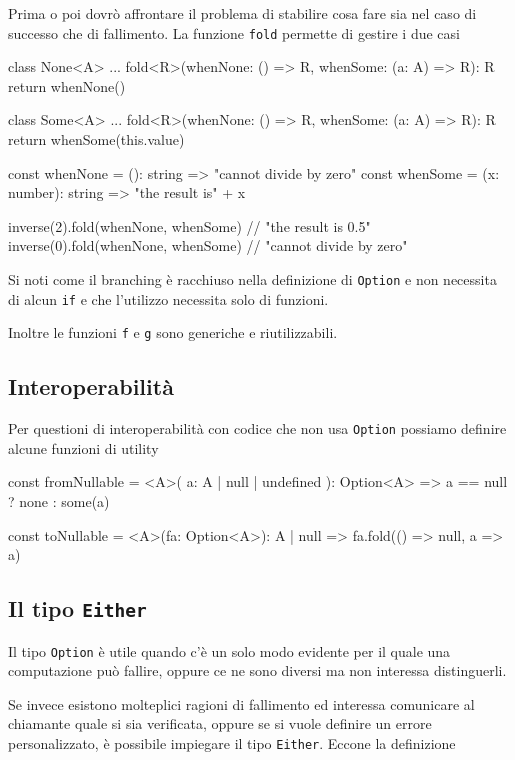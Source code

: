 \documentclass[12pt]{article}
\theoremstyle{definition}
\newenvironment{code}
  {\vspace{0.5cm} \VerbatimEnvironment\begin{typescriptcode}}
  {\end{typescriptcode} \vspace{0.2cm}}
\begin{document}
Prima o poi dovrò affrontare il problema di stabilire cosa fare sia nel caso di successo che di fallimento.
La funzione \texttt{fold} permette di gestire i due casi

\begin{code}
class None<A> {
  ...
  fold<R>(whenNone: () => R, whenSome: (a: A) => R): R {
    return whenNone()
  }
}

class Some<A> {
  ...
  fold<R>(whenNone: () => R, whenSome: (a: A) => R): R {
    return whenSome(this.value)
  }
}

const whenNone = (): string => "cannot divide by zero"
const whenSome = (x: number): string => "the result is" + x

inverse(2).fold(whenNone, whenSome) // "the result is 0.5"
inverse(0).fold(whenNone, whenSome) // "cannot divide by zero"
\end{code}

Si noti come il branching è racchiuso nella definizione di \texttt{Option} e non necessita di alcun \texttt{if}
e che l'utilizzo necessita solo di funzioni.

Inoltre le funzioni \texttt{f} e \texttt{g} sono generiche e riutilizzabili.

\subsection{Interoperabilità}

Per questioni di interoperabilità con codice che non usa \texttt{Option} possiamo definire alcune funzioni di utility

\begin{code}
const fromNullable = <A>(
  a: A | null | undefined
): Option<A> => a == null ? none : some(a)

const toNullable = <A>(fa: Option<A>): A | null =>
  fa.fold(() => null, a => a)
\end{code}

\subsection{Il tipo \texttt{Either}}

Il tipo \texttt{Option} è utile quando c'è un solo modo evidente per il quale una computazione può fallire,
oppure ce ne sono diversi ma non interessa distinguerli.

Se invece esistono molteplici ragioni di fallimento ed interessa comunicare al chiamante quale si sia verificata,
oppure se si vuole definire un errore personalizzato, è possibile impiegare il tipo \texttt{Either}. Eccone la definizione
\end{document}
